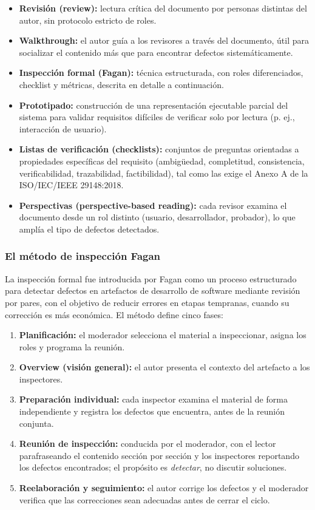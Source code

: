 \documentclass[11pt,a4paper]{article}
\begin{document}
\begin{itemize}
  \item \textbf{Revisión (review):} lectura crítica del documento por
  personas distintas del autor, sin protocolo estricto de roles.
  \item \textbf{Walkthrough:} el autor guía a los revisores a través del
  documento, útil para socializar el contenido más que para encontrar
  defectos sistemáticamente.
  \item \textbf{Inspección formal (Fagan):} técnica estructurada, con
  roles diferenciados, checklist y métricas, descrita en detalle a
  continuación.
  \item \textbf{Prototipado:} construcción de una representación
  ejecutable parcial del sistema para validar requisitos difíciles de
  verificar solo por lectura (p. ej., interacción de usuario).
  \item \textbf{Listas de verificación (checklists):} conjuntos de
  preguntas orientadas a propiedades específicas del requisito
  (ambigüedad, completitud, consistencia, verificabilidad, trazabilidad,
  factibilidad), tal como las exige el Anexo A de la ISO/IEC/IEEE
  29148:2018.
  \item \textbf{Perspectivas (perspective-based reading):} cada revisor
  examina el documento desde un rol distinto (usuario, desarrollador,
  probador), lo que amplía el tipo de defectos detectados.
\end{itemize}
 
\subsubsection{El método de inspección Fagan}
 
La inspección formal fue introducida por Fagan \cite{fagan1976} como un
proceso estructurado para detectar defectos en artefactos de desarrollo de
software mediante revisión por pares, con el objetivo de reducir errores
en etapas tempranas, cuando su corrección es más económica. El método
define cinco fases:
 
\begin{enumerate}
  \item \textbf{Planificación:} el moderador selecciona el material a
  inspeccionar, asigna los roles y programa la reunión.
  \item \textbf{Overview (visión general):} el autor presenta el contexto
  del artefacto a los inspectores.
  \item \textbf{Preparación individual:} cada inspector examina el
  material de forma independiente y registra los defectos que encuentra,
  antes de la reunión conjunta.
  \item \textbf{Reunión de inspección:} conducida por el moderador, con
  el lector parafraseando el contenido sección por sección y los
  inspectores reportando los defectos encontrados; el propósito es
  \emph{detectar}, no discutir soluciones.
  \item \textbf{Reelaboración y seguimiento:} el autor corrige los
  defectos y el moderador verifica que las correcciones sean adecuadas
  antes de cerrar el ciclo.
\end{enumerate}
 
\end{document}
